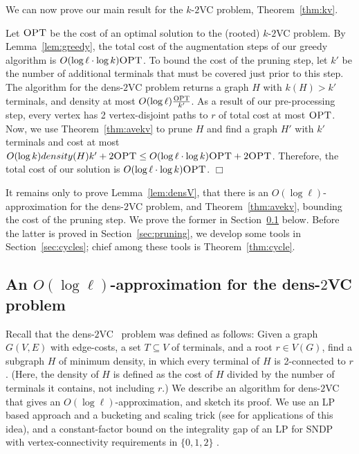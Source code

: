 \documentclass[11pt]{article}
\newenvironment{proofof}[1]{\smallskip\noindent{\bf Proof of #1:}}{\hspace*{\fill}$\Box$\par}
\newcommand{\kvc}[1]{$k$-$#1${\sc VC} }
\newcommand{\kv}{\kvc{2}}
\newcommand{\densV}{dens-$2${\sc VC} }
\newcommand{\opt}{\textrm{\sc OPT}}
\begin{document}
\noindent We can now prove our main result for the \kv problem,
Theorem~\ref{thm:kv}.

\begin{proofof}{Theorem~\ref{thm:kv}}
  Let $\opt$ be the cost of an optimal solution to the (rooted) \kv
  problem.  By Lemma~\ref{lem:greedy}, the total cost of the
  augmentation steps of our greedy algorithm is $O(\log \ell \cdot
  \log k) \opt$. To bound the cost of the pruning step, let $k'$ be
  the number of additional terminals that must be covered just prior
  to this step. The algorithm for the \densV problem returns a graph
  $H$ with $k(H) > k'$ terminals, and density at most $O(\log \ell)
  \frac{\opt}{k'}$. As a result of our pre-processing step, every
  vertex has 2 vertex-disjoint paths to $r$ of total cost at most
  $\opt$. Now, we use Theorem~\ref{thm:avekv} to prune $H$ and find a
  graph $H'$ with $k'$ terminals and cost at most $O(\log k)
  density(H) k' + 2 \opt \le O(\log \ell \cdot \log k) \opt + 2
  \opt$. Therefore, the total cost of our solution is $O(\log \ell
  \cdot \log k) \opt$.
\end{proofof}

\bigskip
It remains only to prove Lemma~\ref{lem:densV}, that there is an $O(\log
\ell)$-approximation for the \densV problem, and
Theorem~\ref{thm:avekv}, bounding the cost of the pruning step. We
prove the former in Section~\ref{subsec:LP} below. Before the latter
is proved in Section~\ref{sec:pruning}, we develop some tools in
Section~\ref{sec:cycles}; chief among these tools is
Theorem~\ref{thm:cycle}. 

\subsection{An $O(\log \ell)$-approximation for the \densV problem}
\label{subsec:LP}

Recall that the \densV~problem was defined as follows: Given a graph
$G(V,E)$ with edge-costs, a set $T \subseteq V$ of terminals, and a
root $r \in V(G)$, find a subgraph $H$ of minimum density, in which
every terminal of $H$ is 2-connected to $r$. (Here, the density of $H$
is defined as the cost of $H$ divided by the number of terminals it
contains, not including $r$.)  We describe an algorithm for \densV
that gives an $O(\log \ell)$-approximation, and sketch its proof. We
use an LP based approach and a bucketing and scaling trick (see
\cite{ChekuriEGS08,ChekuriHKS06,ChekuriHKS07} for applications of this
idea), and a constant-factor bound on the integrality gap of an LP for
SNDP with vertex-connectivity requirements in $\{0,1,2\}$
\cite{FleischerJW}.
\end{document}
